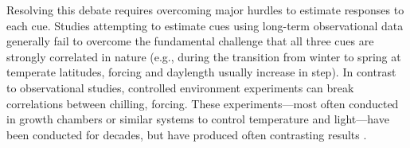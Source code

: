 \documentclass{article}
\begin{document}
\par Resolving this debate requires overcoming major hurdles to estimate responses to each cue. Studies attempting to estimate cues using long-term observational data \citep[e.g.,][]{vitasse2013, zohner2016} generally fail to overcome the fundamental challenge that all three cues are strongly correlated in nature (e.g., during the transition from winter to spring at temperate latitudes, forcing and daylength usually increase in step). In contrast to observational studies, controlled environment experiments can break correlations between chilling, forcing. These experiments---most often conducted in growth chambers or similar systems to control temperature and light---have been conducted for decades, but have produced often contrasting results \citep{zohner2016,Laube:2014a,Basler:2012,Caffarra:2011b,Caffarra:2011a}. 

\end{document}
